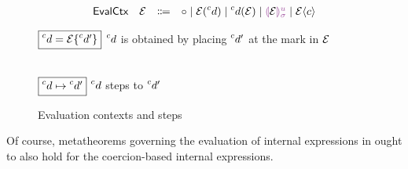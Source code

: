 \documentclass[index.tex]{subfiles}
\begin{document}
\begin{figure}[htb!]
  \[\begin{array}{rrcl}
    \EVMName & \EVMV & \Coloneqq & \EVEmpty \mid \EVApL{\EVMV}{\IEMV} \mid \EVApR{\IEMV}{\EVMV} 
                                 \mid \EVHole{\EVMV}{\IEHoleNum}{\IEHoleEnv} \mid \EVCast{\EVMV}{\CMV}
  \end{array}\]

  $\judgbox{\markAt{\IEMV}{\EVMV}{\IEMV'}}$ $\IEMV$ is obtained by placing $\IEMV'$ at the mark
  in $\EVMV$

  \begin{mathpar}




  \end{mathpar} \\

  $\judgbox{\stepsTo{\IEMV}{\IEMV'}}$ $\IEMV$ steps to $\IEMV'$
  
  \begin{mathpar}
  \end{mathpar}
  \caption{Evaluation contexts and steps}
  \label{fig:coercion-contextual-dynamics}
\end{figure}

Of course, metatheorems governing the evaluation of internal expressions in \HazelnutLive{} ought to
also hold for the coercion-based internal expressions.
 
\end{document}
